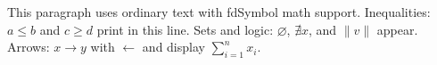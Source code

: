 \documentclass{article}
\begin{document}
This paragraph uses ordinary text with fdSymbol math support.
Inequalities: $a \leqslant b$ and $c \geqslant d$ print in this line.
Sets and logic: $\varnothing$, $\nexists x$, and $\lVert v \rVert$ appear.
Arrows: $x \rightarrow y$ with $\leftarrow$ and display $\sum_{i=1}^{n} x_i$.
\end{document}
